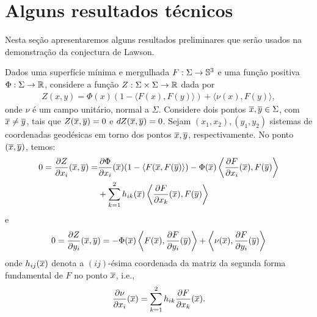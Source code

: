 \section{Alguns resultados técnicos}

Nesta se\c c\~ao apresentaremos alguns resultados preliminares
que ser\~ao usados na demonstra\c c\~ao da conjectura de
Lawson. 

\vspace{.2cm}

Dados uma superfície mínima e mergulhada $F:\Sigma\to\mathbb{S}^3$ 
e uma função positiva $\Phi: \Sigma\to\mathbb R$, considere a função 
$Z:\Sigma\times\Sigma\to\mathbb R$ dada por
\begin{eqnarray}\label{eq:funcaoZ}
Z(x,y) = \Phi(x) (1 - \langle F(x), F(y) \rangle) + \langle \nu(x), F(y) \rangle,
\end{eqnarray}
onde $\nu$ \'e um campo unitário, normal a $\Sigma$. Considere dois 
pontos $\overline{x}, \overline{y} \in \Sigma$, com $\overline{x} \neq \overline{y}$, tais que $Z(\overline{x}, \overline{y}) = 0$ e $dZ(\overline{x}, \overline{y}) = 0$. Sejam $(x_1,x_2), (y_1,y_2)$ sistemas de coordenadas geodésicas em torno dos pontos $\overline{x}, \overline{y}$, respectivamente. No ponto $(\overline{x},\overline{y})$, temos:
\begin{eqnarray}\label{diff_Z_x}
\begin{aligned}
0 = \frac{\partial Z}{\partial x_i} (\overline{x}, \overline{y}) = &
\frac{\partial \Phi}{\partial x_i}(\overline{x}) (1 - \langle F(\overline{x}, F(\overline{y}) \rangle) -  
\Phi(\overline{x}) \left\langle \frac{\partial F}{\partial x_i}(\overline{x}), F(\overline{y}) \right\rangle \\ & + \sum_{k=1}^{2} h_{ik}(\overline{x}) \left\langle \frac{\partial F}{\partial x_k}(\overline{x}), F(\overline{y}) \right\rangle
\end{aligned}
\end{eqnarray}
e
\begin{equation}\label{diff_Z_y}
0 = \frac{\partial Z}{\partial y_i} (\overline{x}, \overline{y}) = - \Phi(\overline{x}) \left\langle F(\overline{x}), \frac{\partial F}{\partial y_i} (\overline{y}) \right\rangle + \left\langle \nu(\overline{x}), \frac{\partial F}{\partial y_i}(\overline{y}) \right\rangle
\end{equation}
onde $h_{ij}(\overline{x})$ denota a $(ij)$-ésima coordenada da matriz da segunda forma fundamental de $F$ no ponto $\overline{x}$, i.e.,
\begin{eqnarray}\label{eq:partialNu}
\frac{\partial\nu}{\partial x_i}(\overline{x}) = 
\sum_{k=1}^2h_{ik}\frac{\partial F}{\partial x_k}(\overline{x}).
\end{eqnarray}

\vspace{.2cm}

